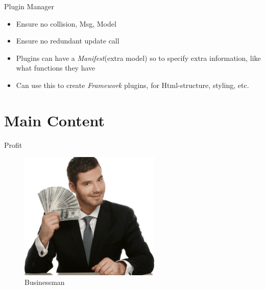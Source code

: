 \documentclass[UKenglish]{beamer}
\begin{document}
\begin{frame}{Plugin Manager}
\begin{itemize}
  \item Ensure no collision, Msg, Model
  \item Ensure no redundant update call
  \item Plugins can have a \textit{Manifest}(extra model)
    so to specify extra information, like what
    functions they have
  \item Can use this to create \textit{Framework}
    plugins, for Html-structure, styling, etc.
\end{itemize}
\end{frame}


\section{Main Content}
\begin{frame}{Profit}
    \begin{figure}
        \centering
        \includegraphics[width=0.6\textwidth]{../../pics/grindset.png}
        \caption{Businessman}
    \end{figure}
\end{frame}
\end{document}
